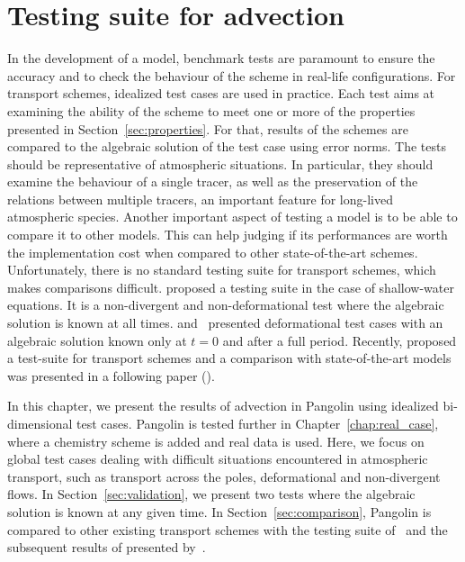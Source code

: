 \chapter{Testing suite for advection}
\label{chap:testing}

In the development of a model, benchmark tests are paramount to ensure the
accuracy and to check the behaviour of the scheme in real-life configurations.
For transport schemes, idealized test cases are used in practice.  Each test
aims at examining the ability of the scheme to meet one or more of the
properties presented in Section~\ref{sec:properties}. For that, results of
the schemes are compared to the algebraic solution of the test case using error
norms. The tests should be representative of atmospheric situations. In
particular, they should examine the behaviour of a single tracer, as well as the
preservation of the relations between multiple tracers, an important feature for
long-lived atmospheric species. 
Another important aspect of testing a model is to be able to compare it to other
models. This can help judging if its performances are worth the implementation
cost when compared to other state-of-the-art schemes. Unfortunately, there is no
standard testing suite for transport schemes, which makes comparisons difficult.
\cite{Williamson1992} proposed a testing suite in the case of shallow-water
equations. It is a non-divergent and non-deformational test where the algebraic
solution is known at all times.  \cite{Nair2002} and~\cite{Nair2008} presented
deformational test cases with an algebraic solution known only at $t=0$ and after a
full period. Recently, \cite{Lauritzen2012} proposed a test-suite for transport schemes
and a comparison with state-of-the-art models was presented in a following
paper (\cite{Lauritzen2014}).

In this chapter, we present the results of advection in Pangolin using idealized
bi-dimensional test cases. Pangolin is tested further in Chapter~\ref{chap:real_case}, where a
chemistry scheme is added and real data is used.  Here, we focus on
global test cases dealing with difficult situations encountered in atmospheric
transport, such as transport across the poles, deformational and non-divergent
flows. In Section~\ref{sec:validation}, we present two tests where the 
algebraic solution is known at any given time. In Section~\ref{sec:comparison},
Pangolin is compared to other existing transport schemes with the testing suite
of~\cite{Lauritzen2012} and the subsequent results of presented by~\cite{Lauritzen2014}.

